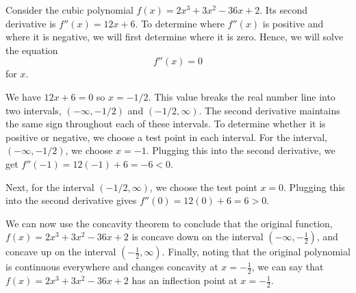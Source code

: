 \documentclass[handout]{ximera}
\begin{document}
\begin{example}[example 5]
Consider the cubic polynomial $f(x) = 2x^3 + 3x^2 - 36x +2$.  Its second derivative is 
$f''(x) = 12x + 6$.  To determine where $f''(x)$ is positive and where it is negative, 
we will first determine where it is zero. Hence, we will solve the equation
\[f''(x) = 0\]
for $x$.

We have $12x + 6 = 0$ so $x = -1/2$.
This value breaks the real number line into two intervals, $(-\infty, -1/2)$ and $(-1/2, \infty)$.
The second derivative maintains the same sign throughout each of these intervals.  
To determine whether it is positive or negative, we choose a test point in each interval.
For the interval, $(-\infty, -1/2)$, we choose $x = -1$.  Plugging this into the second derivative, we get
$f''(-1) = 12(-1) + 6 = -6 < 0$.  

Next, for the interval $(-1/2, \infty)$, we choose the test point 
$x = 0$.  Plugging this into the second derivative gives $f''(0) = 12(0) + 6 = 6 > 0$.





\begin{image}
\end{image}


We can now use the concavity theorem to conclude that
the original function,
$f(x) = 2x^3 + 3x^2 - 36x +2$ is concave down on the interval $(-\infty, -\frac12)$,
and concave up on the interval $(-\frac12, \infty)$.
Finally, noting that the original polynomial is continuous everywhere and changes concavity at $x = -\frac12$, 
we can say that
$f(x) = 2x^3 + 3x^2 - 36x +2$ has an inflection point at $x = -\frac12$.


\end{example}
\end{document}
